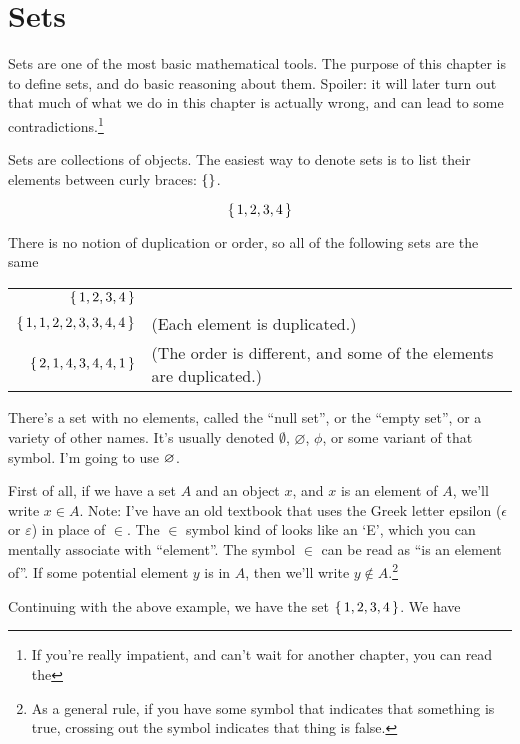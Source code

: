 \chapter{Sets}

Sets are one of the most basic mathematical tools. The purpose of this
chapter is to define sets, and do basic reasoning about them. Spoiler:
it will later turn out that much of what we do in this chapter is
actually wrong, and can lead to some contradictions.\footnote{If
  you're really impatient, and can't wait for another chapter, you can
  read the }

Sets are collections of objects. The easiest way to denote sets is to
list their elements between curly braces: $\left\{  \right\}$.

\begin{displaymath}
  \left\{ \, 1,2,3,4 \, \right\}
\end{displaymath}

There is no notion of duplication or order, so all of the following
sets are the same

\begin{tabu}{rp{8.5cm}}
  $\left\{ \, 1,2,3,4 \, \right\}$         & \\
  $\left\{ \, 1,1,2,2,3,3,4,4 \, \right\}$ & (Each element is duplicated.) \\
  $\left\{ \, 2,1,4,3,4,4,1 \, \right\}$   & (The order is different, and some of the elements are duplicated.)
\end{tabu}

There's a set with no elements, called the ``null set'', or the
``empty set'', or a variety of other names. It's usually denoted
$\emptyset$, $\varnothing$, $\phi$, or some variant of that
symbol. I'm going to use $\varnothing$.

First of all, if we have a set $A$ and an object $x$, and $x$ is an
element of $A$, we'll write $x \in A$. Note: I've have an old textbook
that uses the Greek letter epsilon ($\epsilon$ or $\varepsilon$) in
place of $\in$. The $\in$ symbol kind of looks like an `E', which you
can mentally associate with ``element''. The symbol $\in$ can be read
as ``is an element of''. If some potential element $y$ is  in
$A$, then we'll write $y \notin A$.\footnote{As a general rule, if you
  have some symbol that indicates that something is true, crossing out
  the symbol indicates that thing is false.}

Continuing with the above example, we have the set
$\left\{ \, 1,2,3,4 \, \right\}$. We have


